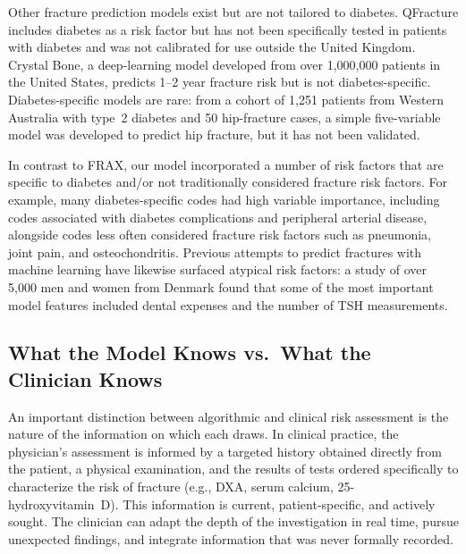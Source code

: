 \documentclass[12pt]{article}
\begin{document}
Other fracture prediction models exist but are not tailored to diabetes. QFracture includes diabetes as a risk factor but has not been specifically tested in patients with diabetes and was not calibrated for use outside the United Kingdom. Crystal Bone, a deep-learning model developed from over 1,000,000 patients in the United States, predicts 1--2 year fracture risk but is not diabetes-specific. Diabetes-specific models are rare: from a cohort of 1,251 patients from Western Australia with type~2 diabetes and 50 hip-fracture cases, a simple five-variable model was developed to predict hip fracture, but it has not been validated.

In contrast to FRAX, our model incorporated a number of risk factors that are specific to diabetes and/or not traditionally considered fracture risk factors. For example, many diabetes-specific codes had high variable importance, including codes associated with diabetes complications and peripheral arterial disease, alongside codes less often considered fracture risk factors such as pneumonia, joint pain, and osteochondritis. Previous attempts to predict fractures with machine learning have likewise surfaced atypical risk factors: a study of over 5,000 men and women from Denmark found that some of the most important model features included dental expenses and the number of TSH measurements.

\subsection{What the Model Knows vs.\ What the Clinician Knows}

An important distinction between algorithmic and clinical risk assessment is the nature of the information on which each draws. In clinical practice, the physician's assessment is informed by a targeted history obtained directly from the patient, a physical examination, and the results of tests ordered specifically to characterize the risk of fracture (e.g., DXA, serum calcium, 25-hydroxyvitamin~D). This information is current, patient-specific, and actively sought. The clinician can adapt the depth of the investigation in real time, pursue unexpected findings, and integrate information that was never formally recorded.
\end{document}
